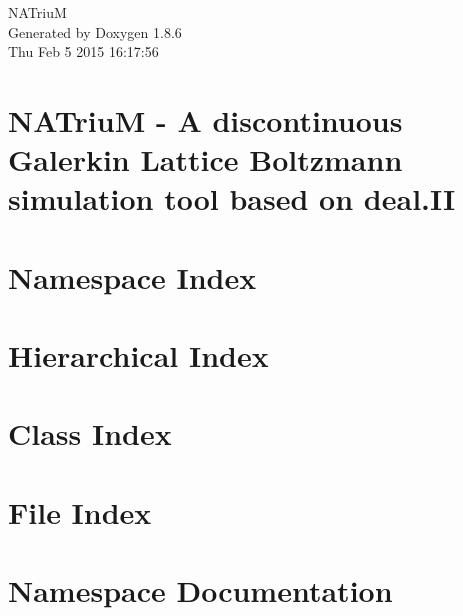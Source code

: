 \documentclass[twoside]{book}
\newcommand{\clearemptydoublepage}{%
  \newpage{\pagestyle{empty}\cleardoublepage}%
}
\begin{document}
\hypersetup{pageanchor=false}
\begin{titlepage}
\vspace*{7cm}
\begin{center}%
{\Large N\-A\-Triu\-M }\\
\vspace*{1cm}
{\large Generated by Doxygen 1.8.6}\\
\vspace*{0.5cm}
{\small Thu Feb 5 2015 16:17:56}\\
\end{center}
\end{titlepage}
\clearemptydoublepage
\tableofcontents
\clearemptydoublepage
{}
\hypersetup{pageanchor=true}

\chapter{N\-A\-Triu\-M -\/ A discontinuous Galerkin Lattice Boltzmann simulation tool based on deal.\-I\-I}
\label{index}\hypertarget{index}{}
\chapter{Namespace Index}

\chapter{Hierarchical Index}

\chapter{Class Index}

\chapter{File Index}

\chapter{Namespace Documentation}

\end{document}
